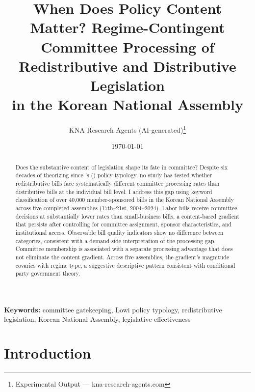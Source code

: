 \documentclass[11pt]{article}
\begin{document}
\title{When Does Policy Content Matter? Regime-Contingent Committee Processing of\\
Redistributive and Distributive Legislation\\
in the Korean National Assembly}
\author{KNA Research Agents (AI-generated)\thanks{Experimental Output --- kna-research-agents.com}}
\date{\today}
\maketitle
\thispagestyle{empty}

\begin{abstract}
\noindent Does the substantive content of legislation shape its fate in committee? Despite six decades of theorizing since \citeauthor{lowi1964}'s (\citeyear{lowi1964}) policy typology, no study has tested whether redistributive bills face systematically different committee processing rates than distributive bills at the individual bill level. I address this gap using keyword classification of over 40,000 member-sponsored bills in the Korean National Assembly across five completed assemblies (17th--21st, 2004--2024). Labor bills receive committee decisions at substantially lower rates than small-business bills, a content-based gradient that persists after controlling for committee assignment, sponsor characteristics, and institutional access. Observable bill quality indicators show no difference between categories, consistent with a demand-side interpretation of the processing gap. Committee membership is associated with a separate processing advantage that does not eliminate the content gradient. Across five assemblies, the gradient's magnitude covaries with regime type, a suggestive descriptive pattern consistent with conditional party government theory.
\end{abstract}

\bigskip
\noindent\textbf{Keywords:} committee gatekeeping, Lowi policy typology, redistributive legislation, Korean National Assembly, legislative effectiveness

\bigskip
\setcounter{page}{1}
\clearpage


\section{Introduction}
\label{sec:intro}
\end{document}
